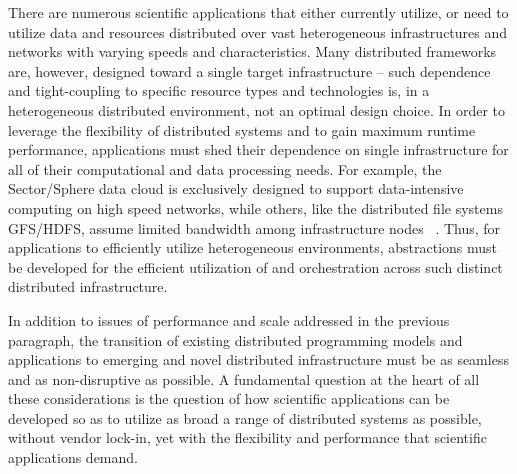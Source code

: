 \documentclass[3p,twocolumn]{elsarticle}
\begin{document}
There are numerous scientific applications that either currently
utilize, or need to utilize data and resources distributed over vast
heterogeneous infrastructures and networks with varying speeds and
characteristics.  Many distributed frameworks are, however, designed
toward a single target infrastructure -- such dependence and tight-coupling to specific
resource types and technologies is, in a heterogeneous distributed
environment, not an optimal design choice.
In order to leverage the flexibility of distributed systems and to
gain maximum runtime performance, applications must shed their
dependence on single infrastructure for all of their computational and
data processing needs. For example, the Sector/Sphere data cloud is
exclusively designed to support data-intensive computing on high speed
networks, while others, like the distributed file systems GFS/HDFS, assume
limited bandwidth among infrastructure nodes ~\cite{GFS, HDFS}.  Thus,
for applications to efficiently utilize heterogeneous environments,
abstractions must be developed for the efficient utilization of and
orchestration across such distinct distributed infrastructure.


In addition to issues of performance and scale addressed in the
previous paragraph, the transition of existing distributed programming
models and applications to emerging and novel distributed
infrastructure must be as seamless and as non-disruptive as
possible.  A fundamental question at the heart of all these
considerations is the question of how scientific applications can be
developed so as to utilize as broad a range of distributed systems as
possible, without vendor lock-in, yet with the flexibility and
performance that scientific applications demand.

\end{document}

